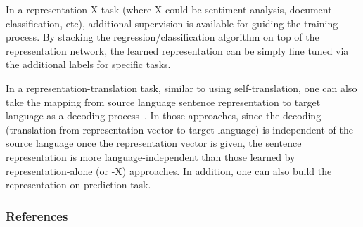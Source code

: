 \documentclass{article} %
\begin{document}
In a representation-X task (where X could be sentiment analysis, document
classification, etc), additional supervision is available for guiding the
training process. By stacking the regression/classification algorithm on top of
the representation network, the learned representation can be simply fine tuned
via the additional labels for specific tasks.

In a representation-translation task, similar to using self-translation, one can
also take the mapping from source language sentence representation to target
language as a decoding process~\cite{sutskever2014sequence,}. In those
approaches, since the decoding (translation from representation vector to target
language) is independent of the source language once the representation vector
is given, the sentence representation is more language-independent than those
learned by representation-alone (or -X) approaches. In addition, one can also
build the representation on prediction task.

\fi


\subsubsection{References}

% 

\end{document}
